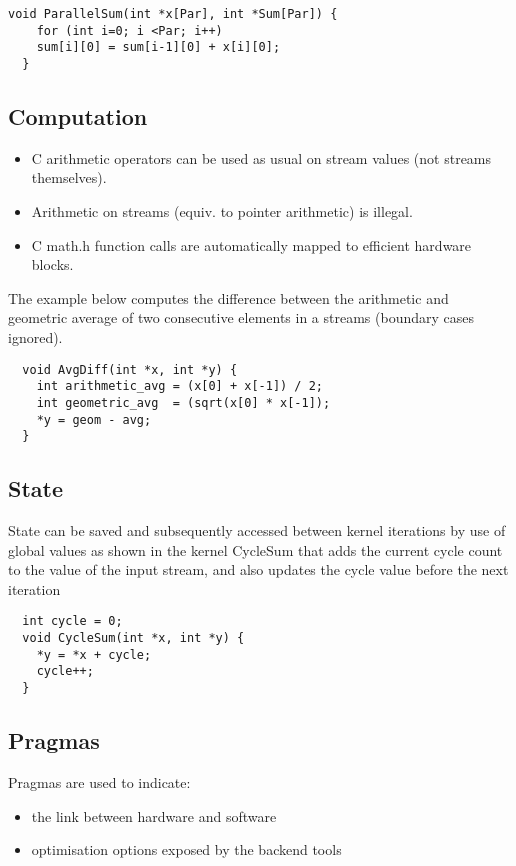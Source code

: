 \begin{lstlisting}[caption={Using loops for \FAST{} design parametrisation}]
  void ParallelSum(int *x[Par], int *Sum[Par]) {
    for (int i=0; i <Par; i++)
    sum[i][0] = sum[i-1][0] + x[i][0];
  }
\end{lstlisting}
\subsection{Computation}

\begin{itemize}

\item C arithmetic operators can be used as usual on stream values (not streams themselves).
\item Arithmetic on streams (equiv. to pointer arithmetic) is illegal.
\item C math.h function calls are automatically mapped to efficient hardware blocks.

\end{itemize}

The example below computes the difference between the arithmetic and geometric average of two consecutive elements in a streams (boundary cases ignored).


\begin{lstlisting}
  void AvgDiff(int *x, int *y) {
    int arithmetic_avg = (x[0] + x[-1]) / 2;
    int geometric_avg  = (sqrt(x[0] * x[-1]);
    *y = geom - avg;
  }
\end{lstlisting}

\subsection{State}
State can be saved and subsequently accessed between kernel iterations
by use of global values as shown in the kernel CycleSum that adds the
current cycle count to the value of the input stream, and also updates
the cycle value before the next iteration
\begin{lstlisting}
  int cycle = 0;
  void CycleSum(int *x, int *y) {
    *y = *x + cycle;
    cycle++;
  }
\end{lstlisting}

\subsection{Pragmas}

Pragmas are used to indicate:
\begin{itemize}
\item the link between hardware and software
\item optimisation options exposed by the backend tools
\end{itemize}


